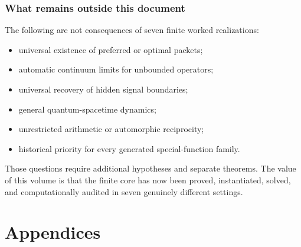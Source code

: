 \documentclass[11pt,oneside]{book}
\theoremstyle{definition}
\theoremstyle{remark}
\begin{document}
\section{What remains outside this document}
The following are not consequences of seven finite worked realizations:
\begin{itemize}
\item universal existence of preferred or optimal packets;
\item automatic continuum limits for unbounded operators;
\item universal recovery of hidden signal boundaries;
\item general quantum-spacetime dynamics;
\item unrestricted arithmetic or automorphic reciprocity;
\item historical priority for every generated special-function family.
\end{itemize}
Those questions require additional hypotheses and separate theorems. The value of this volume is that the finite core has now been proved, instantiated, solved, and computationally audited in seven genuinely different settings.

\appendix

\part{Appendices}
\end{document}
